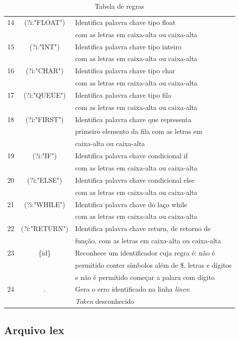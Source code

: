 \documentclass[12pt]{article}
\begin{document}
\begin{table}
\begin{tabular}{|c || c  l |}
 \hline
 14 & (?i:"FLOAT")& Identifica palavra chave tipo float \\&& com as letras em caixa-alta ou caixa-alta \\
 \hline
 15 & (?i:"INT")& Identifica palavra chave tipo inteiro \\&& com as letras em caixa-alta ou caixa-alta \\
 \hline
 16 & (?i:"CHAR") & Identifica palavra chave tipo char \\&& com as letras em caixa-alta ou caixa-alta \\
 \hline
 17 & (?i:"QUEUE")& Identifica palavra chave tipo fila \\&& com as letras em caixa-alta ou caixa-alta \\
 \hline
 18 & (?i:"FIRST")& Identifica palavra chave que representa \\&&  primeiro elemento da fila com as letras em \\&& caixa-alta ou caixa-alta  \\
 \hline
 19 & (?i:"IF")& Identifica palavra chave condicional if \\&& com as letras em caixa-alta ou caixa-alta \\
 \hline
 20 & (?i:"ELSE")& Identifica palavra chave condicional else \\&& com as letras em caixa-alta ou caixa-alta \\
 \hline
 21 & (?i:"WHILE")& Identifica palavra chave do laço while \\&& com as letras em caixa-alta ou caixa-alta \\
 \hline
 22 & (?i:"RETURN")& Identifica palavra chave return, de retorno de \\&& função, com as letras em caixa-alta ou caixa-alta \\
 \hline
 23 & \{id\} & Reconhece um identificador cuja regra é: não é \\&& permitido conter símbolos além de \$, letras e  dígitos \\&& e não é permitido começar a palara com dígito \\
 \hline
 24 & . & {\color{red}Gera o erro identificado na linha \textit{lines}:} \\&& {\color{red}\textit{Token} desconhecido} \\
 \hline
\end{tabular}
\caption{Tabela de regras}
\label{TabelaRegras}
\end{table}


\subsection{Arquivo lex}
\end{document}
